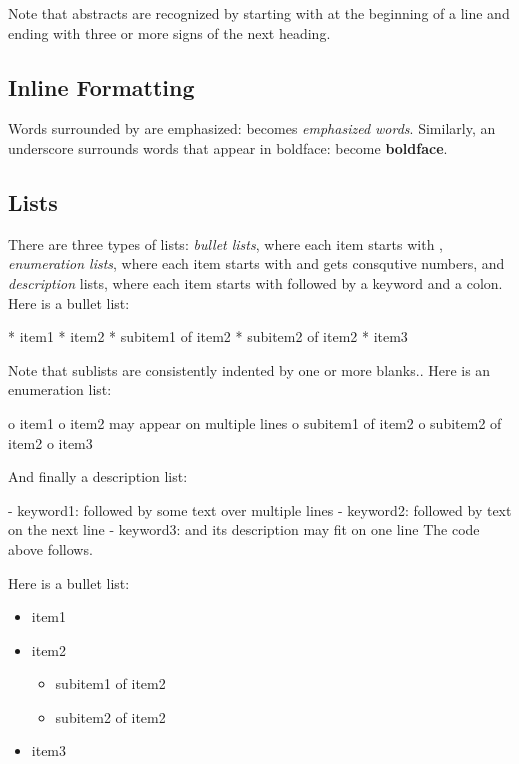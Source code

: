 \documentclass[twoside]{book}
\begin{document}
\noindent
Note that abstracts are recognized by starting with  at
the beginning of a line and ending with three or more \code{=} signs of the
next heading.

\subsection{Inline Formatting}

Words surrounded by \code{*} are emphasized:  becomes
\emph{emphasized words}. Similarly, an underscore surrounds words that
appear in boldface:  become \textbf{boldface}.

\subsection{Lists}

There are three types of lists: \emph{bullet lists}, where each item starts
with \code{*}, \emph{enumeration lists}, where each item starts with  and gets
consqutive numbers,
and \emph{description} lists, where each item starts with \code{-} followed
by a keyword and a colon.
\bccq
Here is a bullet list:

 * item1
 * item2
  * subitem1 of item2
  * subitem2 of item2
 * item3

Note that sublists are consistently indented by one or more blanks..
Here is an enumeration list:

 o item1
 o item2
   may appear on
   multiple lines
  o subitem1 of item2
  o subitem2 of item2
 o item3

And finally a description list:

 - keyword1: followed by
   some text
   over multiple
   lines
 - keyword2:
   followed by text on the next line
 - keyword3: and its description may fit on one line
\eccq
The code above follows.

Here is a bullet list:

\begin{itemize}
 \item item1

 \item item2
\begin{itemize}

  \item subitem1 of item2

  \item subitem2 of item2

\end{itemize}

\noindent
 \item item3
\end{itemize}
\end{document}
